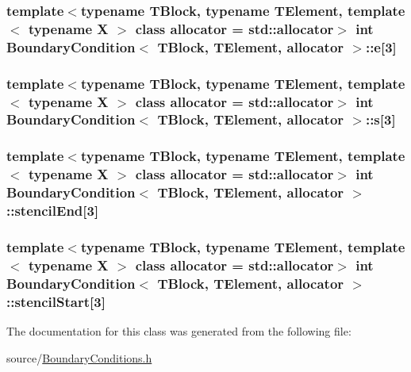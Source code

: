 \subsubsection[{e}]{\setlength{\rightskip}{0pt plus 5cm}template$<$typename T\+Block, typename T\+Element, template$<$ typename X $>$ class allocator = std\+::allocator$>$ int {\bf Boundary\+Condition}$<$ T\+Block, T\+Element, allocator $>$\+::e\mbox{[}3\mbox{]}\hspace{0.3cm}{\ttfamily [protected]}}\label{class_boundary_condition_a755da05bbc5a09adb17a6f1e5a15f25b}
\hypertarget{class_boundary_condition_a7734cfc6ee1ce3a1dea426ab289a299a}{}
\subsubsection[{s}]{\setlength{\rightskip}{0pt plus 5cm}template$<$typename T\+Block, typename T\+Element, template$<$ typename X $>$ class allocator = std\+::allocator$>$ int {\bf Boundary\+Condition}$<$ T\+Block, T\+Element, allocator $>$\+::s\mbox{[}3\mbox{]}\hspace{0.3cm}{\ttfamily [protected]}}\label{class_boundary_condition_a7734cfc6ee1ce3a1dea426ab289a299a}
\hypertarget{class_boundary_condition_af396b479ba0487ba5c0e45d5b636f09e}{}
\subsubsection[{stencil\+End}]{\setlength{\rightskip}{0pt plus 5cm}template$<$typename T\+Block, typename T\+Element, template$<$ typename X $>$ class allocator = std\+::allocator$>$ int {\bf Boundary\+Condition}$<$ T\+Block, T\+Element, allocator $>$\+::stencil\+End\mbox{[}3\mbox{]}\hspace{0.3cm}{\ttfamily [protected]}}\label{class_boundary_condition_af396b479ba0487ba5c0e45d5b636f09e}
\hypertarget{class_boundary_condition_aed1e3cfd20d69c6084d901c246698fdd}{}
\subsubsection[{stencil\+Start}]{\setlength{\rightskip}{0pt plus 5cm}template$<$typename T\+Block, typename T\+Element, template$<$ typename X $>$ class allocator = std\+::allocator$>$ int {\bf Boundary\+Condition}$<$ T\+Block, T\+Element, allocator $>$\+::stencil\+Start\mbox{[}3\mbox{]}\hspace{0.3cm}{\ttfamily [protected]}}\label{class_boundary_condition_aed1e3cfd20d69c6084d901c246698fdd}


The documentation for this class was generated from the following file\+:\begin{DoxyCompactItemize}
\item 
source/\hyperlink{_boundary_conditions_8h}{Boundary\+Conditions.\+h}\end{DoxyCompactItemize}
